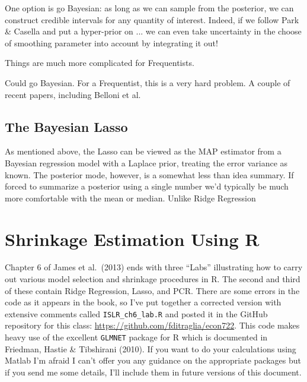 \documentclass[12pt]{article}
\theoremstyle{definition}
\begin{document}
One option is go Bayesian: as long as we can sample from the posterior, we can construct credible intervals for any quantity of interest. Indeed, if we follow Park \& Casella and put a hyper-prior on ... we can even take uncertainty in the choose of smoothing parameter into account by integrating it out! 

Things are much more complicated for Frequentists. 


Could go Bayesian. For a Frequentist, this is a very hard problem. A couple of recent papers, including Belloni et al.

\subsection{The Bayesian Lasso}
As mentioned above, the Lasso can be viewed as the MAP estimator from a Bayesian regression model with a Laplace prior, treating the error variance as known. The posterior mode, however, is a somewhat less than idea summary. If forced to summarize a posterior using a single number we'd typically be much more comfortable with the mean or median. Unlike Ridge Regression


\section{Shrinkage Estimation Using R}
Chapter 6 of James et al.\ (2013) ends with three ``Labs'' illustrating how to carry out various model selection and shrinkage procedures in R. The second and third of these contain Ridge Regression, Lasso, and PCR. There are some errors in the code as it appears in the book, so I've put together a corrected version with extensive comments called \texttt{ISLR\_ch6\_lab.R} and posted it in the GitHub repository for this class: \url{https://github.com/fditraglia/econ722}. This code makes heavy use of the excellent \texttt{GLMNET} package for R which is documented in Friedman, Hastie \& Tibshirani (2010). If you want to do your calculations using Matlab I'm afraid I can't offer you any guidance on the appropriate packages but if you send me some details, I'll include them in future versions of this document.
\end{document}
